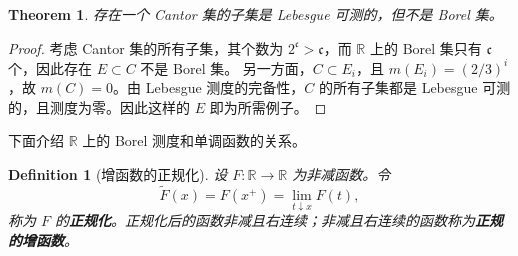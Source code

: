 \documentclass[12pt,letterpaper,twoside,openright]{ctexbook}
\theoremstyle{bluehead}
\newtheorem{theorem}{Theorem}
\theoremstyle{olivehead}
\newtheorem{definition}{Definition}
\theoremstyle{orangehead}
\theoremstyle{redremark}
\begin{document}
\begin{theorem}
存在一个 Cantor 集的子集是 Lebesgue 可测的，但不是 Borel 集。
\end{theorem}
\begin{proof}
考虑 Cantor 集的所有子集，其个数为 $2^{\mathfrak{c}}>\mathfrak{c}$，而 $\mathbb{R}$ 上的 Borel 集只有 $\mathfrak{c}$ 个，因此存在 $E\subset C$ 不是 Borel 集。
另一方面，$C\subset E_i$，且 $m(E_i)=(2/3)^i$，故 $m(C)=0$。由 Lebesgue 测度的完备性，$C$ 的所有子集都是 Lebesgue 可测的，且测度为零。因此这样的 $E$ 即为所需例子。
\end{proof}
\noindent
下面介绍 $\mathbb{R}$ 上的 Borel 测度和单调函数的关系。
\begin{definition}[增函数的正规化]
设 $F:\mathbb{R}\to\mathbb{R}$ 为非减函数。令
\[
\widetilde F(x)=F(x^+)=\lim_{t\downarrow x}F(t),
\]
称为 $F$ 的\textbf{正规化}。正规化后的函数非减且右连续；非减且右连续的函数称为\textbf{正规的增函数}。
\end{definition}
\end{document}
